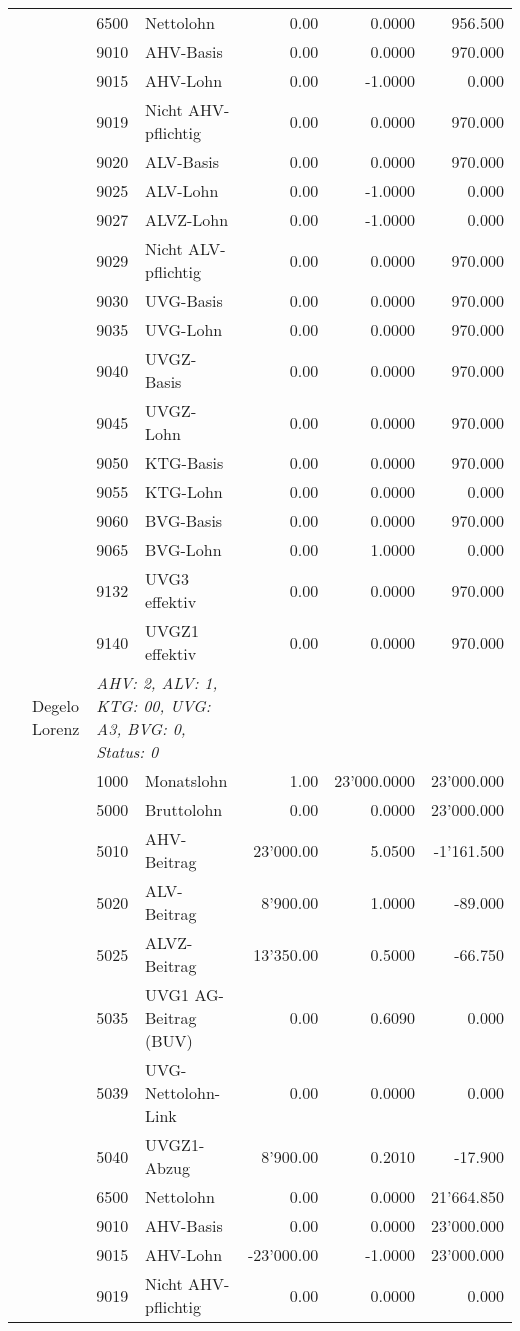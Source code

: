 \documentclass[15pt,a4paper]{article}
\begin{document}
\begin{longtable}{@{\extracolsep{\fill}}l l l l|r|r|r}
&&6500&Nettolohn&0.00&0.0000&956.500\\
&&9010&AHV-Basis&0.00&0.0000&970.000\\
&&9015&AHV-Lohn&0.00&-1.0000&0.000\\
&&9019&Nicht AHV-pflichtig&0.00&0.0000&970.000\\
&&9020&ALV-Basis&0.00&0.0000&970.000\\
&&9025&ALV-Lohn&0.00&-1.0000&0.000\\
&&9027&ALVZ-Lohn&0.00&-1.0000&0.000\\
&&9029&Nicht ALV-pflichtig&0.00&0.0000&970.000\\
&&9030&UVG-Basis&0.00&0.0000&970.000\\
&&9035&UVG-Lohn&0.00&0.0000&970.000\\
&&9040&UVGZ-Basis&0.00&0.0000&970.000\\
&&9045&UVGZ-Lohn&0.00&0.0000&970.000\\
&&9050&KTG-Basis&0.00&0.0000&970.000\\
&&9055&KTG-Lohn&0.00&0.0000&0.000\\
&&9060&BVG-Basis&0.00&0.0000&970.000\\
&&9065&BVG-Lohn&0.00&1.0000&0.000\\
&&9132&UVG3 effektiv&0.00&0.0000&970.000\\
&&9140&UVGZ1 effektiv&0.00&0.0000&970.000\\
\pagebreak
4&Degelo Lorenz&\multicolumn{2}{l|}{\small\emph{AHV: 2, ALV: 1, KTG: 00, UVG: A3, BVG: 0, Status: 0}}&& \\
&&1000&Monatslohn&1.00&23'000.0000&23'000.000\\
&&5000&Bruttolohn&0.00&0.0000&23'000.000\\
&&5010&AHV-Beitrag&23'000.00&5.0500&-1'161.500\\
&&5020&ALV-Beitrag&8'900.00&1.0000&-89.000\\
&&5025&ALVZ-Beitrag&13'350.00&0.5000&-66.750\\
&&5035&UVG1 AG-Beitrag (BUV)&0.00&0.6090&0.000\\
&&5039&UVG-Nettolohn-Link&0.00&0.0000&0.000\\
&&5040&UVGZ1-Abzug&8'900.00&0.2010&-17.900\\
&&6500&Nettolohn&0.00&0.0000&21'664.850\\
&&9010&AHV-Basis&0.00&0.0000&23'000.000\\
&&9015&AHV-Lohn&-23'000.00&-1.0000&23'000.000\\
&&9019&Nicht AHV-pflichtig&0.00&0.0000&0.000\\

\end{longtable}
\end{document}
